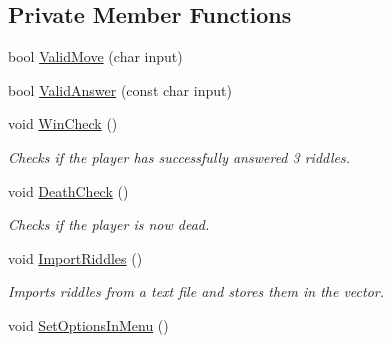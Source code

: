 \subsection*{Private Member Functions}
\begin{DoxyCompactItemize}
\item 
bool \hyperlink{classCodeCracker_a793271a6ea1d8affad8fdddbbd692f7a}{Valid\-Move} (char input)
\item 
bool \hyperlink{classCodeCracker_ae1f112c18049c0ecc3e52bfcf1398ccd}{Valid\-Answer} (const char input)
\item 
void \hyperlink{classCodeCracker_a3177ddb9deb208ac462d55970b112626}{Win\-Check} ()
\begin{DoxyCompactList}\small\item\em Checks if the player has successfully answered 3 riddles. \end{DoxyCompactList}\item 
void \hyperlink{classCodeCracker_a9fd7f74660bef36842fc8293b3d5ed31}{Death\-Check} ()
\begin{DoxyCompactList}\small\item\em Checks if the player is now dead. \end{DoxyCompactList}\item 
void \hyperlink{classCodeCracker_a13ef45a98032d321c825e7a2c5439a33}{Import\-Riddles} ()
\begin{DoxyCompactList}\small\item\em Imports riddles from a text file and stores them in the vector. \end{DoxyCompactList}\item 
void \hyperlink{classCodeCracker_acbbd890be17cec27b879eb369de82017}{Set\-Options\-In\-Menu} ()
\end{DoxyCompactItemize}
